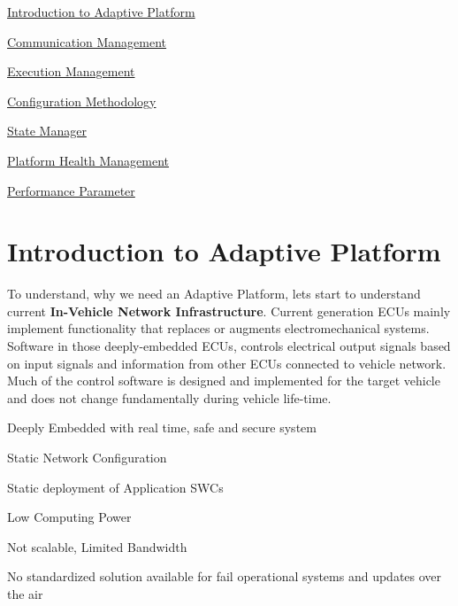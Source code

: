 
\begin{DoxyItemize}
\item \hyperlink{adaptive_platform_introduction}{Introduction to Adaptive Platform}
\item \hyperlink{adaptive_communicationmanagement}{Communication Management}
\item \hyperlink{adaptive_executionmanagement}{Execution Management}
\item \hyperlink{adaptive_configurationmethodology}{Configuration Methodology}
\item \hyperlink{adaptive_state_manager}{State Manager}
\item \hyperlink{Guideline_Document_for_Platform_Health_Management}{Platform Health Management}
\item \hyperlink{Performance_parameter}{Performance Parameter} 
\end{DoxyItemize}\hypertarget{adaptive_platform_introduction}{}\section{Introduction to Adaptive Platform}\label{adaptive_platform_introduction}
To understand, why we need an Adaptive Platform, let\textquotesingle{}s start to understand current {\bfseries In-\/\+Vehicle Network Infrastructure}. Current generation E\+C\+Us mainly implement functionality that replaces or augments electromechanical systems. Software in those deeply-\/embedded E\+C\+Us, controls electrical output signals based on input signals and information from other E\+C\+Us connected to vehicle network. Much of the control software is designed and implemented for the target vehicle and does not change fundamentally during vehicle life-\/time. 
\begin{DoxyItemize}
\item Deeply Embedded with real time, safe and secure system
\item Static Network Configuration
\item Static deployment of Application S\+W\+Cs
\item Low Computing Power
\item Not scalable, Limited Bandwidth
\item No standardized solution available for fail operational systems and updates over the air
\end{DoxyItemize}

